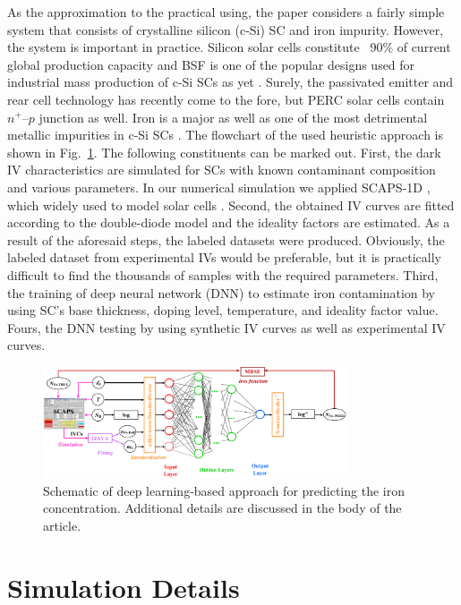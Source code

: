 \documentclass[num-refs]{wiley-article} %
\begin{document}
As the approximation to the practical using, the paper considers a fairly simple system
that consists of crystalline silicon (c-Si) SC  and iron impurity.
However, the system is important in practice.
Silicon solar cells constitute ~90\% of current global production capacity \cite{SCRev2015} and
BSF  is one of  the popular designs used for industrial mass production of c-Si SCs as yet \cite{SCRev2020,GreenRew2019}.
Surely, the passivated emitter and rear cell technology has
recently come to the fore, but PERC solar cells contain $n^+$--$p$ junction as well\cite{GreenRew2019,WilsonRew2020}.
Iron is a major as well as one of the most detrimental metallic impurities in c-Si SCs \cite{ZHU2016192,FeB:Schmidt,IronSC}.
The flowchart of the used heuristic approach is shown in Fig.~\ref{fig_chem}.
The following constituents can be marked out.
First, the dark IV characteristics are simulated for SCs with known contaminant composition and various parameters.
In our numerical simulation we applied SCAPS-1D \cite{SCAPS1,SCAPS2},
which widely used to model solar cells \cite{SCAPSuseSi4,SCAPSuseSi1,SCAPSuseSi6,SCAPSuse1,SCAPSuse2020,SCAPSuse2017SM}.
Second, the obtained IV curves are fitted according to the double-diode model and the ideality factors are estimated.
As a result of the aforesaid steps, the labeled datasets were produced.
Obviously, the labeled dataset from experimental IVs  would be preferable,
but it is practically difficult to find the thousands of samples with the required parameters.
Third, the training of deep neural network (DNN) to estimate iron contamination  by using SC's base thickness, doping level,
temperature, and ideality factor value.
Fours, the DNN testing by using synthetic IV curves as well as experimental IV curves.

\begin{figure}
\centering
\includegraphics[width=0.8\textwidth]{Chem}
\caption{Schematic of deep learning-based approach  for predicting the iron concentration.
Additional details are discussed in the body of the article.}
\label{fig_chem}
\end{figure}


\section{Simulation Details}
\end{document}
